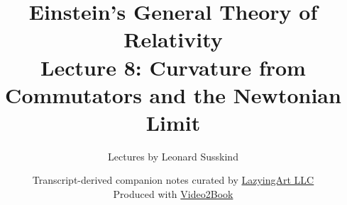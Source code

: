 \documentclass[11pt,oneside]{book}
\begin{document}
\frontmatter
\hypersetup{pageanchor=false}
\title{Einstein's General Theory of Relativity\\[0.45em]
\large Lecture 8: Curvature from Commutators and the Newtonian Limit}
\author{Lectures by Leonard Susskind}
\date{Transcript-derived companion notes curated by
\href{https://lazying.art}{LazyingArt LLC}\\[0.35em]
\small Produced with
\href{https://github.com/lachlanchen/Video2Book}{Video2Book}}
\maketitle
\hypersetup{pageanchor=true}
\clearpage
\mainmatter

\end{document}
